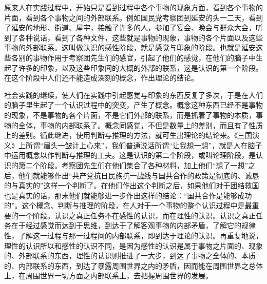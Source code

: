 原来人在实践过程中，开始只是看到过程中各个事物的现象方面，看到各个事物的片面，看到各个事物之间的外部联系。例如国民党考察团到延安的头一二天，看到了延安的地形、街道、屋宇，接触了许多的人，参加了宴会、晚会与群众大会，听到了各种说话，看到了各种文件，这些就是事物的现象，事物的各个片面以及这些事物的外部联系。这叫做认识的感性阶段，就是感觉与印象的阶段。也就是延安这些各别的事物作用于考察团先生们的感官，引起了他们的感觉，在他们的脑子中生起了许多的印象，以及这些印象间的大概的外部的联系，这是认识的第一个阶段。在这个阶段中人们还不能造成深刻的概念，作出理论的结论。

社会实践的继续，使人们在实践中引起感觉与印象的东西反复了多次，于是在人们的脑子里生起了一个认识过程中的突变，产生了概念。概念这种东西已经不是事物的现象，不是事物的各个片面，不是它们外部的联系，而是抓着了事物的本质，事物的全体，事物的内部联系了。概念同感觉，不但是数量上的差别，而且有了性质上的差别。循此继进，使用判断与推理的方法，就可生出理论的结论来。《三国演义》上所谓“眉头一皱计上心来”，我们普通说话所谓“让我想一想”，就是人在脑子中运用概念以作判断与推理的工夫。这是认识的第二个阶段，或叫论理阶段，是认识的第二个阶段。考察团先生们在他们集合了各种材料，加上他们“想了一想”之后，他们就能够作出“共产党抗日民族抗一战线与国共合作的政策是彻底的、诚恳的与真实的”这样一个判断了。在他们作出这个判断之后，如果他们对于团结救国也是真实的话，那末他们就能够进一步作出这样的结论：“国共合作是能够成功的”。这个概念、判断与推理的阶段，在人对于一个事物的整个认识过程中是最重要的一个阶段。认识之真正任务不在感性的认识，而在理性的认识。认识之真正任务在于经过感觉而达到于思维，到达于了解客观事物的内部矛盾，了解它的规律性，了解这一过程与那一过程间的内部联系，即到达于理论的认识。再重复地说，理性的认识所以和感性的认识不同，是因为感性的认识是属于事物之片面的、现象的、外部联系的东西，理性的认识则推进了一大步，到达了事物之全体的、本质的、内部联系的东西，到达了暴露周围世界之内的矛盾，因而能在周围世界之总体上，在周围世界一切方面之内部联系上，去把握周围世界的发展。

